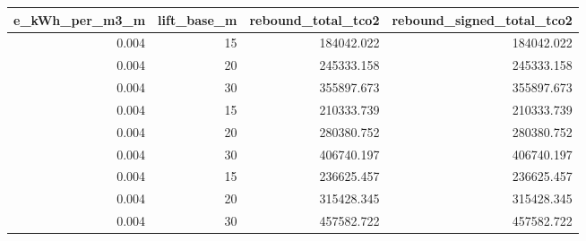 \begin{tabular}{rrrr}
\toprule
e_kWh_per_m3_m & lift_base_m & rebound_total_tco2 & rebound_signed_total_tco2 \\
\midrule
0.004 & 15 & 184042.022 & 184042.022 \\
0.004 & 20 & 245333.158 & 245333.158 \\
0.004 & 30 & 355897.673 & 355897.673 \\
0.004 & 15 & 210333.739 & 210333.739 \\
0.004 & 20 & 280380.752 & 280380.752 \\
0.004 & 30 & 406740.197 & 406740.197 \\
0.004 & 15 & 236625.457 & 236625.457 \\
0.004 & 20 & 315428.345 & 315428.345 \\
0.004 & 30 & 457582.722 & 457582.722 \\
\bottomrule
\end{tabular}
